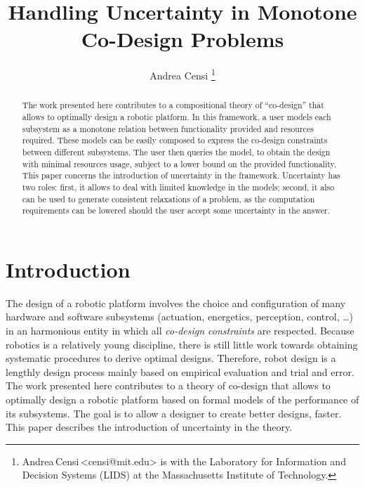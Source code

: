 \documentclass[twocolumn,english]{IEEEconf}
\makeatletter
\theoremstyle{plain}
\theoremstyle{definition}
\theoremstyle{definition}
\theoremstyle{plain}
\newcommand{\colR}{\color[rgb]{0.555789,0.000000,0.000000}}
\newcommand{\colF}{\color[rgb]{0.094869,0.500000,0.000000}}
\newcommand{\R}[1]{{\colR #1}}
\newcommand{\F}[1]{{\colF #1}}
\newcommand{\person}[2]{#1\,{\footnotesize<#2>\rm}}
\newcommand{\mythanks}{
  \protect\thanks{\person{Andrea\,Censi}{censi@mit.edu} is with the
  Laboratory for Information and Decision Systems (LIDS)
  at the Massachusetts Institute of Technology.
}}
\makeatother
\begin{document}
\title{Handling Uncertainty in Monotone Co-Design Problems}

\author{Andrea Censi\mythanks}
\maketitle
\begin{abstract}
The work presented here contributes to a compositional theory of
``co-design'' that allows to optimally design a robotic platform.
In this framework, a user models each subsystem as a monotone relation
between \F{functionality provided} and \R{resources required}.
These models can be easily composed to express the co-design constraints
between different subsystems. The user then queries the model, to
obtain the design with minimal resources usage, subject to a lower
bound on the provided functionality. This paper concerns the introduction
of uncertainty in the framework. Uncertainty has two roles: first,
it allows to deal with limited knowledge in the models; second, it
also can be used to generate consistent relaxations of a problem,
as the computation requirements can be lowered should the user accept
some uncertainty in the answer.
\end{abstract}


\section{Introduction}

The design of a robotic platform involves the choice and configuration
of many hardware and software subsystems (actuation, energetics, perception,
control, \ldots{}) in an harmonious entity in which all \emph{co-design
constraints} are respected. Because robotics is a relatively young
discipline, there is still little work towards obtaining systematic
procedures to derive optimal designs. Therefore, robot design is a
lengthly design process mainly based on empirical evaluation and trial
and error. The work presented here contributes to a theory of co-design
that allows to optimally design a robotic platform based on formal
models of the performance of its subsystems. The goal is to allow
a designer to create better designs, faster. This paper describes
the introduction of uncertainty in the theory.
\end{document}
